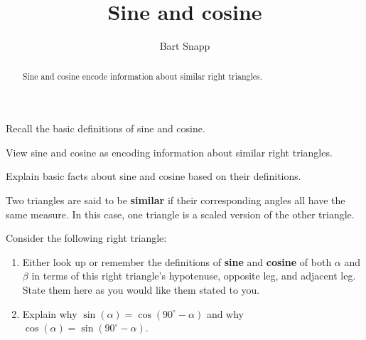 \documentclass[noauthor,nooutcomes,hints,handout,12pt]{ximera}
\title{Sine and cosine}
\author{Bart Snapp}
\begin{document}
\begin{abstract}
  Sine and cosine encode information about similar right triangles.
\end{abstract}
\maketitle

\begin{listOutcomes}
\item Recall the basic definitions of sine and cosine.
\item View sine and cosine as encoding information about similar right
  triangles.
\item Explain basic facts about sine and cosine based on their
  definitions.
\end{listOutcomes}



\begin{definition}
 Two triangles are said to be \textbf{similar} if their corresponding angles all have the same measure.  In this case, one triangle is a scaled version of the other triangle.
\end{definition}


\mynewpage


\begin{question}
  Consider the following right triangle:
  \begin{center}
    \end{center}
  \begin{enumerate}
  \item Either look up or remember the definitions of \textbf{sine}
    and \textbf{cosine} of both $\alpha$ and $\beta$ in terms of this
    right triangle's hypotenuse, opposite leg, and adjacent leg. State them here as you would like them stated to you.  
    \item Explain why $\sin(\alpha) =
    \cos(90^\circ-\alpha)$ and why $\cos(\alpha) =
    \sin(90^\circ-\alpha)$.
\end{enumerate}
\end{question}
\mynewpage
\end{document}
